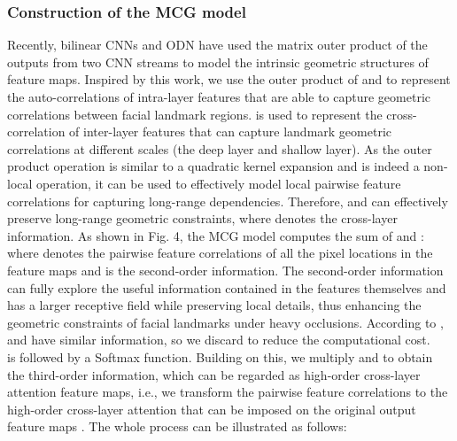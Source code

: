 \documentclass[journal]{IEEEtran}
\begin{document}
\subsubsection{Construction of the MCG model}
Recently, bilinear CNNs \cite{ lin2017bilinear} and ODN \cite{Zhu2019RobustFL} have used the matrix outer product of the outputs from two CNN streams to model the intrinsic geometric structures of feature maps. Inspired by this work, we use the outer product of  and  to represent the auto-correlations of intra-layer features that are able to capture geometric correlations between facial landmark regions.  is used to represent the cross-correlation of inter-layer features that can capture landmark geometric correlations at different scales (the deep layer and shallow layer). As the outer product operation is similar to a quadratic kernel expansion and is indeed a non-local operation, it can be used to effectively model local pairwise feature correlations for capturing long-range dependencies. Therefore,  and  can effectively preserve long-range geometric constraints, where  denotes the cross-layer information. As shown in Fig. 4, the MCG model computes the sum of  and :
where  denotes the pairwise feature correlations of all the pixel locations in the feature maps and  is the second-order information. The second-order information can fully explore the useful information contained in the features themselves and has a larger receptive field while preserving local details, thus enhancing the geometric constraints of facial landmarks under heavy occlusions. According to \cite{Sun2017HyperlayerBP},  and  have similar information, so we discard  to reduce the computational cost. 
\\\indent  is followed by a Softmax function. Building on this, we multiply  and  to obtain the third-order information, which can be regarded as high-order cross-layer attention feature maps, i.e., we transform the pairwise feature correlations to the high-order cross-layer attention that can be imposed on the original output feature maps . The whole process can be illustrated as follows:
\end{document}
